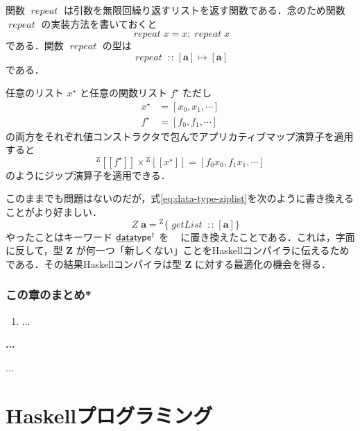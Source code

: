 \documentclass[a4paper,twocolumn]{jsbook}
\def\[{\left[\!\left[}
\def\]{\right]\!\right]}
\newcommand{\programminglanguage}[1]{\textsf{#1}}
\newcommand{\haskell}{\programminglanguage{Haskell}}
\newenvironment{note}[1]{\begin{boxnote}\begin{center}\textbf{#1}\end{center}}{\end{boxnote}}
\newcommand{\mKeyword}[1]{\mathsf{#1}} %
\newcommand{\mKeywordUnderline}[1]{\text{\underline{\textsf{#1}}}} %
\newcommand{\mDataTypeKeyword}{\mKeywordUnderline{data}\mKeyword{type}}
\newcommand{\mNewDataTypeKeyword}{\mKeyword{newtype}}
\DeclareMathOperator{\mDataTypeParametric}{\mDataTypeKeyword^\dagger}
\DeclareMathOperator{\mNewDataTypeParametric}{\mNewDataTypeKeyword^\dagger}
\newcommand{\mFunc}[1]{\mathop{\mathit{#1}}}
\DeclareMathOperator{\mGetList}{\mFunc{getList}}
\DeclareMathOperator{\mRepeat}{\mFunc{repeat}}
\DeclareMathOperator{\mAppMap}{\times}
\DeclareMathOperator{\mIn}{{:\!:}}
\DeclareMathOperator{\mMapsTo}{\mapsto}
\newcommand{\mZipList}{Z}
\newcommand{\mType}[1]{\mathbf{#1}}
\newcommand{\mListType}[1]{[\mType{#1}]}
\newcommand{\mTypeConstructor}[1]{\textit{#1}}
\DeclareMathOperator{\mZipListTypeConstructor}{\mTypeConstructor{\mZipList}}
\newcommand{\mGenericValueConstructor}[1]{\mathrm{#1}}
\newcommand{\mGenericWith}[2]{{}^\mGenericValueConstructor{#1}\[#2\]}
\newcommand{\mGenericRecordWith}[2]{{}^\mGenericValueConstructor{#1}\{#2\}}
\newcommand{\mZipListWith}[1]{\mGenericWith{\mZipList}{#1}}
\newcommand{\mZipListRecordWith}[1]{\mGenericRecordWith{\mZipList}{#1}}
\newcommand{\mListWith}[1]{\left[#1\right]}
\newcommand{\mList}[1]{{#1}^\mathrm{\star}}
\newcommand{\mProj}[2]{#1\mMapsTo#2}
\begin{document}
関数 $\mRepeat$ は引数を無限回繰り返すリストを返す関数である．念のため関数 $\mRepeat$ の実装方法を書いておくと
\begin{equation}
\mRepeat x=x:\mRepeat x
\end{equation}
である．関数 $\mRepeat$ の型は
\begin{equation}
\mRepeat\mIn{}\mProj{\mListType{a}}{\mListType{a}}
\end{equation}
である．

任意のリスト $\mList{x}$ と任意の関数リスト $\mList{f}$ ただし
\begin{align}
\mList{x}&=\mListWith{x_0,x_1,\dotsb}\\
\mList{f}&=\mListWith{f_0,f_1,\dotsb}
\end{align}
の両方をそれぞれ値コンストラクタで包んでアプリカティブマップ演算子を適用すると
\begin{equation}
\mZipListWith{\mList{f}}\mAppMap\mZipListWith{\mList{x}}
=\mListWith{f_0x_0,f_1x_1,\dotsb}
\end{equation}
のようにジップ演算子を適用できる．

このままでも問題はないのだが，式\eqref{eq:data-type-ziplist}を次のように書き換えることがより好ましい．
\begin{equation}
\mNewDataTypeParametric\;\mZipListTypeConstructor\mType{a}=\mZipListRecordWith{\mGetList\mIn{}\mListType{a}}
\end{equation}
やったことはキーワード $\mDataTypeParametric$ を $\mNewDataTypeParametric$ に置き換えたことである．これは，字面に反して，型 $\mType{\mZipList}$ が何一つ「新しくない」ことを\haskell コンパイラに伝えるためである．その結果\haskell コンパイラは型 $\mType{\mZipList}$ に対する最適化の機会を得る．

\section{この章のまとめ*}

\begin{enumerate}
\item ...
\end{enumerate}

\begin{note}{...}
...
\end{note}


\part{\haskell プログラミング}
\end{document}
